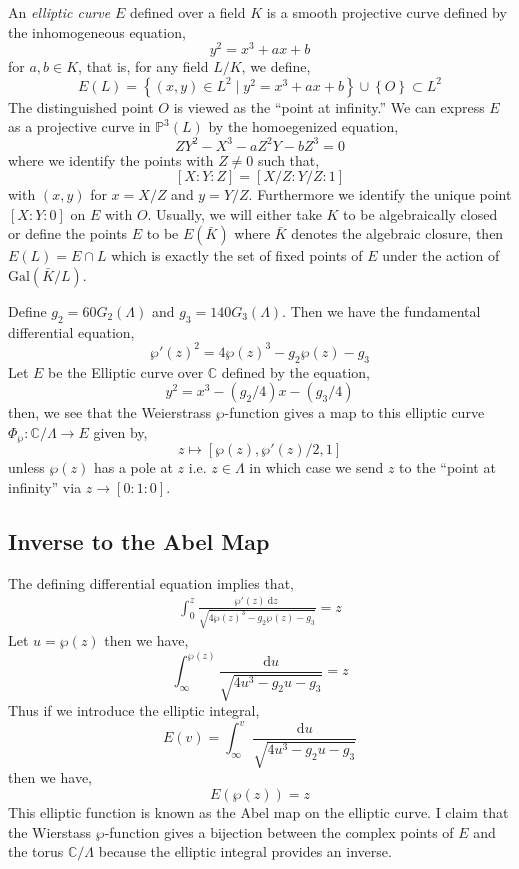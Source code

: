 \documentclass{article}
\newcommand{\Gal}[1]{\mathrm{Gal}\left( #1 \right)}
\newcommand{\C}{\mathbb{C}}
\renewcommand{\d}[1]{\: \mathrm{d}#1 \:}
\theoremstyle{definition}
\newenvironment{definition}[1][Definition:]{\begin{trivlist}
\item[\hskip \labelsep {\bfseries #1}]}{\end{trivlist}}
\renewcommand{\P}[2]{\mathbb{P}^{#1} \left( #2 \right)}
\begin{document}
\begin{definition}
An \textit{elliptic curve} $E$ defined over a field $K$ is a smooth projective curve defined by the inhomogeneous equation,
\[ y^2 = x^3 + a x + b \]
for $a,b \in K$, that is, for any field $L / K$, we define,
\[ E(L) = \left\{ (x,y) \in L^2 \mid y^2 = x^3 + ax + b \right\} \cup \left\{ O \right\} \subset L^2 \]
The distinguished point $O$ is viewed as the ``point at infinity.'' We can express $E$ as a projective curve in $\P{3}{L}$ by the homoegenized equation,
\[ ZY^2 - X^3 - a Z^2 Y - b Z^3 = 0 \]
where we identify the points with $Z \neq 0$ such that,
\[ [X : Y : Z] = [ X/Z : Y/ Z : 1]  \]
with $(x, y)$ for $x = X/Z$ and $y = Y/Z$. Furthermore we identify the unique point $[X : Y : 0]$ on $E$ with $O$. 
Usually, we will either take $K$ to be algebraically closed or define the points $E$ to be $E(\bar{K})$ where $\bar{K}$ denotes the algebraic closure, then $E(L) = E \cap L$ which is exactly the set of fixed points of $E$ under the action of $\Gal{\bar{K}/L}$. 
\end{definition}
Define $g_2 = 60 G_2(\Lambda)$ and $g_3 = 140 G_3(\Lambda)$. Then we have the fundamental differential equation,
\[ \wp'(z)^2 = 4 \wp(z)^3 - g_2 \wp(z) - g_3 \] 
Let $E$ be the Elliptic curve over $\C$ defined by the equation,
\[ y^2 = x^3 - (g_2/4) x - (g_3/4) \]
then, we see that the Weierstrass $\wp$-function gives a map to this elliptic curve $\Phi_{\wp} : \C / \Lambda \to E$ given by,
\[ z \mapsto [\wp(z), \wp'(z)/2, 1] \]
unless $\wp(z)$ has a pole at $z$ i.e. $z \in \Lambda$ in which case we send $z$ to the ``point at infinity'' via $z \to [0 : 1 : 0]$.

\subsection{Inverse to the Abel Map} 

The defining differential equation implies that,
\begin{align*}
\int_{0}^{z} \frac{\wp'(z) \d{z}}{\sqrt{4 \wp(z)^3 - g_2 \wp(z) - g_3}} = z 
\end{align*}
Let $u = \wp(z)$ then we have,
\[ \int_{\infty}^{\wp(z)} \frac{\d{u}}{\sqrt{4 u^3 - g_2 u - g_3}} = z\]
Thus if we introduce the elliptic integral,
\[ E(v) = \int_{\infty}^v \frac{\d{u}}{\sqrt{4 u^3 - g_2 u - g_3}} \]
then we have,
\[ E(\wp(z)) = z \]
This elliptic function is known as the Abel map on the elliptic curve. I claim that the Wierstass $\wp$-function gives a bijection between the complex points of $E$ and the torus $\C / \Lambda$ because the elliptic integral provides an inverse.
\end{document}
